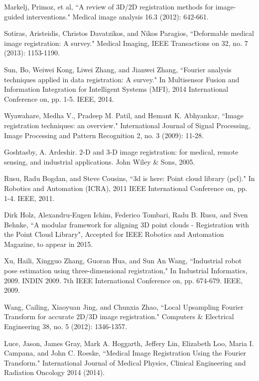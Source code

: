 \documentclass{UCF_ETD}
\begin{document}
\begin{thebibliography}{99}
Markelj, Primoz, et al, ``A review of 3D/2D registration methods for image-guided interventions." Medical image analysis 16.3 (2012): 642-661.

Sotiras, Aristeidis, Christos Davatzikos, and Nikos Paragios, ``Deformable medical image registration: A survey." Medical Imaging, IEEE Transactions on 32, no. 7 (2013): 1153-1190.

Sun, Bo, Weiwei Kong, Liwei Zhang, and Jianwei Zhang, ``Fourier analysis techniques applied in data registration: A survey." In Multisensor Fusion and Information Integration for Intelligent Systems (MFI), 2014 International Conference on, pp. 1-5. IEEE, 2014.

Wyawahare, Medha V., Pradeep M. Patil, and Hemant K. Abhyankar, ``Image registration techniques: an overview." International Journal of Signal Processing, Image Processing and Pattern Recognition 2, no. 3 (2009): 11-28.

Goshtasby, A. Ardeshir. 2-D and 3-D image registration: for medical, remote sensing, and industrial applications. John Wiley \& Sons, 2005.

Rusu, Radu Bogdan, and Steve Cousins, ``3d is here: Point cloud library (pcl)." In Robotics and Automation (ICRA), 2011 IEEE International Conference on, pp. 1-4. IEEE, 2011.

Dirk Holz, Alexandru-Eugen Ichim, Federico Tombari, Radu B. Rusu, and Sven Behnke, ``A modular framework for aligning 3D point clouds - Registration with the Point Cloud Library", Accepted for IEEE Robotics and Automation Magazine, to appear in 2015.

Xu, Haili, Xingguo Zhang, Guoran Hua, and Sun An Wang, ``Industrial robot pose estimation using three-dimensional registration," In Industrial Informatics, 2009. INDIN 2009. 7th IEEE International Conference on, pp. 674-679. IEEE, 2009.

Wang, Cailing, Xiaoyuan Jing, and Chunxia Zhao, ``Local Upsampling Fourier Transform for accurate 2D/3D image registration." Computers \& Electrical Engineering 38, no. 5 (2012): 1346-1357.

Luce, Jason, James Gray, Mark A. Hoggarth, Jeffery Lin, Elizabeth Loo, Maria I. Campana, and John C. Roeske, ``Medical Image Registration Using the Fourier Transform." International Journal of Medical Physics, Clinical Engineering and Radiation Oncology 2014 (2014).


\end{thebibliography}
\end{document}
